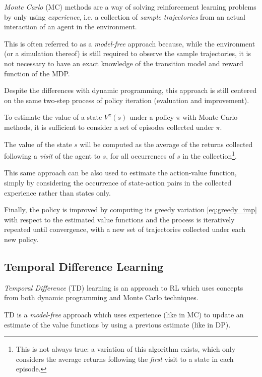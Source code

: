 \textit{Monte Carlo} (MC) methods are a way of solving reinforcement learning problems by 
only using \textit{experience}, i.e. a collection of \textit{sample trajectories}
from an actual interaction of an agent in the environment.

This is often referred to as a \textit{model-free} approach because, while the
environment (or a simulation thereof) is still required to observe the sample
trajectories, it is not necessary to have an exact knowledge of the transition 
model and reward function of the MDP. 

Despite the differences with dynamic programming, this approach is still 
centered on the same two-step process of policy iteration (evaluation and 
improvement).

To estimate the value of a state $V^\pi(s)$ under a policy $\pi$ with Monte 
Carlo methods, it is sufficient to consider a set of episodes collected under 
$\pi$.

The value of the state $s$ will be computed as the average of the returns 
collected following a \textit{visit} of the agent to $s$, for all occurrences of
$s$ in the collection\footnote{This is not always true: a variation of this 
algorithm exists, which only considers the average returns following the 
\textit{first} visit to a state in each episode.}.

This same approach can be also used to estimate the action-value function, simply
by considering the occurrence of state-action pairs in the collected experience
rather than states only. 

Finally, the policy is improved by computing its greedy variation \eqref{eq:greedy_imp}
with respect to the estimated value functions and the process is iteratively
repeated until convergence, with a new set of trajectories collected under each 
new policy.

\subsection{Temporal Difference Learning}
\textit{Temporal Difference} (TD) learning is an approach to RL which uses 
concepts from both dynamic programming and Monte Carlo techniques. 

TD is a \textit{model-free } approach which uses experience (like in MC)
to update an estimate of the value functions by using a previous estimate 
(like in DP).

